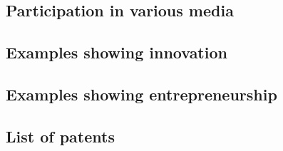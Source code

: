 \subsection{Participation in various media} \label{ssec:participation-in-various-media}
\subsection{Examples showing innovation} \label{ssec:examples-showing-innovation}
\subsection{Examples showing entrepreneurship} \label{ssec:examples-showing-entrepreneurship}
\subsection{List of patents} \label{ssec:list-of-patents}
